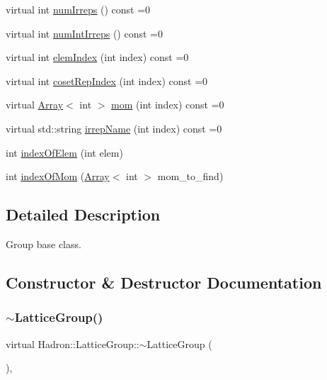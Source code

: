 \begin{DoxyCompactItemize}
\item 
virtual int \mbox{\hyperlink{structHadron_1_1LatticeGroup_a3edaca488144b5d2a9cf73fe653add34}{num\+Irreps}} () const =0
\item 
virtual int \mbox{\hyperlink{structHadron_1_1LatticeGroup_af2aa7b39222bf188389356eefcef7547}{num\+Int\+Irreps}} () const =0
\item 
virtual int \mbox{\hyperlink{structHadron_1_1LatticeGroup_afb8e3ee60de059f75bce1044c694e1e8}{elem\+Index}} (int index) const =0
\item 
virtual int \mbox{\hyperlink{structHadron_1_1LatticeGroup_a7e3b9b5e2f596e6c40d64aa939a3ad6c}{coset\+Rep\+Index}} (int index) const =0
\item 
virtual \mbox{\hyperlink{classXMLArray_1_1Array}{Array}}$<$ int $>$ \mbox{\hyperlink{structHadron_1_1LatticeGroup_ad577b65041dd9a6e84b1f3bd49cb8fce}{mom}} (int index) const =0
\item 
virtual std\+::string \mbox{\hyperlink{structHadron_1_1LatticeGroup_a4bc5620218c2a73157e19bc4451fe746}{irrep\+Name}} (int index) const =0
\item 
int \mbox{\hyperlink{structHadron_1_1LatticeGroup_a4a664d3cbcc8a3b1634e4eb8434f1199}{index\+Of\+Elem}} (int elem)
\item 
int \mbox{\hyperlink{structHadron_1_1LatticeGroup_a49927e4a4d386b2e3eed6f3b5c1ee76d}{index\+Of\+Mom}} (\mbox{\hyperlink{classXMLArray_1_1Array}{Array}}$<$ int $>$ mom\+\_\+to\+\_\+find)
\end{DoxyCompactItemize}


\subsection{Detailed Description}
Group base class. 

\subsection{Constructor \& Destructor Documentation}
\mbox{\label{structHadron_1_1LatticeGroup_a8265941ad6e64b658d2eb904e7d85d62}} 
\subsubsection{\texorpdfstring{$\sim$LatticeGroup()}{~LatticeGroup()}\hspace{0.1cm}{\footnotesize\ttfamily [1/3]}}
{\footnotesize\ttfamily virtual Hadron\+::\+Lattice\+Group\+::$\sim$\+Lattice\+Group (\begin{DoxyParamCaption}{ }\end{DoxyParamCaption})\hspace{0.3cm}{\ttfamily [inline]}, {\ttfamily [virtual]}}

